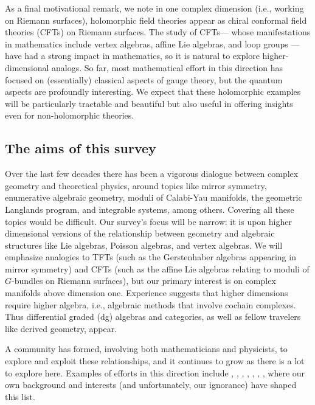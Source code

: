 \documentclass[11pt]{amsart}
\begin{document}
As a final motivational remark, we note in one complex dimension (i.e., working on Riemann surfaces), 
holomorphic field theories appear as chiral conformal field theories (CFTs) on Riemann surfaces. 
The study of CFTs--- whose manifestations in mathematics include vertex algebras, affine Lie algebras, and loop groups --- have had a strong impact in mathematics,
so it is natural to explore higher-dimensional analogs.
So far, most mathematical effort in this direction has focused on (essentially) classical aspects of gauge theory,
but the quantum aspects are profoundly interesting.
We expect that these holomorphic examples will be particularly tractable and beautiful but also useful in offering insights even for non-holomorphic theories.

\subsection{The aims of this survey}

Over the last few decades there has been a vigorous dialogue between complex geometry and theoretical physics,
around topics like mirror symmetry, enumerative algebraic geometry, moduli of Calabi-Yau manifolds, the geometric Langlands program, and integrable systems, among others.
Covering all these topics would be difficult.
Our survey's focus will be narrow:
it is upon higher dimensional versions of the relationship between geometry and algebraic structures like Lie algebras, Poisson algebras, and vertex algebras.
We will emphasize analogies to TFTs (such as the Gerstenhaber algebras appearing in mirror symmetry) and CFTs (such as the affine Lie algebras relating to moduli of $G$-bundles on Riemann surfaces),
but our primary interest is on complex manifolds above dimension one.
Experience suggests that higher dimensions require higher algebra,
i.e., algebraic methods that involve cochain complexes.
Thus differential graded (dg) algebras and categories,
as well as fellow travelers like derived geometry, appear.

A community has formed, involving both mathematicians and physicists, to explore and exploit these relationships,
and it continues to grow as there is a lot to explore here.
Examples of efforts in this direction include \cite{PTVV}, \cite{FHK}, \cite{Keviny things}, \cite{GaiottoEtAl}, \cite{Paquette}, \cite{Vicedo}, \cite{BBBDN}, 
where our own background and interests (and unfortunately, our ignorance) have shaped this list.
\end{document}
